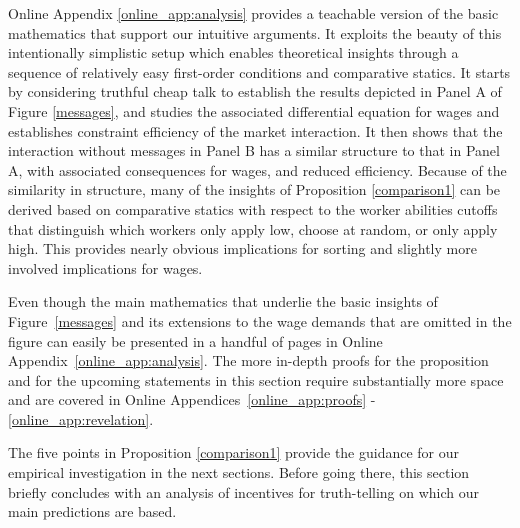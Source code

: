 \documentclass[12pt]{article}
\begin{document}
Online Appendix \ref{online_app:analysis} provides a teachable version of the basic mathematics that support our intuitive arguments. It exploits the beauty of this intentionally simplistic setup which enables theoretical insights through a sequence of relatively easy first-order conditions and comparative statics. It starts by considering truthful cheap talk to establish the results depicted in Panel A of Figure \ref{messages}, and studies the associated differential equation for wages and establishes constraint efficiency of the market interaction. It then shows that the interaction without messages in Panel B has a similar structure to that in Panel A, with associated consequences for wages, and reduced efficiency. Because of the similarity in structure, many of the insights of Proposition \ref{comparison1} can be derived based on comparative statics with respect to the worker abilities cutoffs that distinguish which workers only apply low, choose at random, or only apply high. This provides nearly obvious implications for sorting and slightly more involved implications for wages. 

Even though the main mathematics that underlie the basic insights of Figure~\ref{messages} and its extensions to the wage demands that are omitted in the figure can easily be presented in a handful of pages in Online Appendix~\ref{online_app:analysis}. 
The more in-depth proofs for the proposition and for the upcoming statements in this section require substantially more space and are covered in Online Appendices~\ref{online_app:proofs} - \ref{online_app:revelation}.


The five points in Proposition \ref{comparison1} provide the guidance for our empirical investigation in the next sections. Before going there, this section briefly concludes with an analysis of incentives for truth-telling on which our main predictions are based. 
\end{document}
